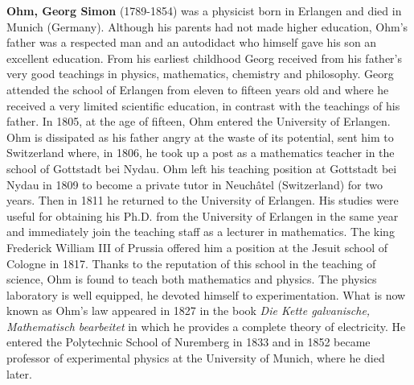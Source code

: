 \textbf{Ohm, Georg Simon} (1789-1854) was a physicist born in Erlangen and died in Munich (Germany). Although his parents had not made higher education, Ohm's father was a respected man and an autodidact who himself gave his son an excellent education. From his earliest childhood Georg received from his father's very good teachings in physics, mathematics, chemistry and philosophy. Georg attended the school of Erlangen from eleven to fifteen years old and where he received a very limited scientific education, in contrast with the teachings of his father. In 1805, at the age of fifteen, Ohm entered the University of Erlangen. Ohm is dissipated as his father angry at the waste of its potential, sent him to Switzerland where, in 1806, he took up a post as a mathematics teacher in the school of Gottstadt bei Nydau. Ohm left his teaching position at Gottstadt bei Nydau in 1809 to become a private tutor in Neuchâtel (Switzerland) for two years. Then in 1811 he returned to the University of Erlangen. His studies were useful for obtaining his Ph.D. from the University of Erlangen in the same year and immediately join the teaching staff as a lecturer in mathematics. The king Frederick William III of Prussia offered him a position at the Jesuit school of Cologne in 1817. Thanks to the reputation of this school in the teaching of science, Ohm is found to teach both mathematics and physics. The physics laboratory is well equipped, he devoted himself to experimentation. What is now known as Ohm's law appeared in 1827 in the book \textit{Die Kette galvanische, Mathematisch bearbeitet} in which he provides a complete theory of electricity. He entered the Polytechnic School of Nuremberg in 1833 and in 1852 became professor of experimental physics at the University of Munich, where he died later.

